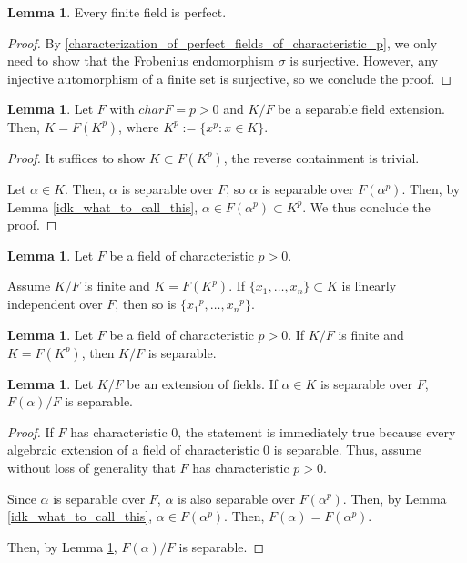 \documentclass{article}
\theoremstyle{definition}
\newtheorem{lemma}[theorem]{Lemma}
\begin{document}
\begin{lemma}
    Every finite field is perfect.
\end{lemma}
\begin{proof}
    By \ref{characterization_of_perfect_fields_of_characteristic_p}, we only need to show that the Frobenius endomorphism $\sigma$
    is surjective. However, any injective automorphism of a finite set is surjective, so we conclude the proof.
\end{proof}

\begin{lemma}
    Let $F$ with $charF = p > 0$ and $K/F$ be a separable field extension.
    Then, $K = F(K^{p})$, where $K^{p} := \{ x^{p}: x \in K\}$.
\end{lemma}
\begin{proof}
    It suffices to show $K \subset F(K^{p})$, the reverse containment is trivial.

    Let $\alpha \in K$. Then, $\alpha$ is separable over $F$, so $\alpha$ is separable over $F(\alpha^{p})$.
    Then, by Lemma \ref{idk_what_to_call_this}, $\alpha \in F(\alpha^{p}) \subset K^{p}$. We thus conclude
    the proof.
\end{proof}

\begin{lemma}
    Let $F$ be a field of characteristic $p > 0$.

    Assume $K/F$ is finite and $K = F(K^{p})$. If $\{x_{1}, \ldots, x_{n}\} \subset K$ is linearly independent
    over $F$, then so is $\{{x_{1}}^{p}, \ldots, {x_{n}}^{p}\}$.
\end{lemma}

\begin{lemma}\label{sufficient_condition_for_separability_over_fields_of_characteristic_p}
    Let $F$ be a field of characteristic $p > 0$. If $K/F$ is finite and $K = F(K^{p})$, then $K/F$ is separable.
\end{lemma}

\begin{lemma}\label{adjoining_separable_elements_produce_separable_extensions}
    Let $K/F$ be an extension of fields. If $\alpha \in K$ is separable over $F$,
    $F(\alpha)/F$ is separable.
\end{lemma}
\begin{proof}
    If $F$ has characteristic $0$, the statement is immediately true
    because every algebraic extension of a field of characteristic $0$ is separable. Thus,
    assume without loss of generality that $F$ has characteristic $p > 0$.

    Since $\alpha$ is separable over $F$, $\alpha$ is also separable over $F(\alpha^{p})$.
    Then, by Lemma \ref{idk_what_to_call_this}, $\alpha \in F(\alpha^{p})$. Then, $F(\alpha) = F(\alpha^{p})$.

    Then, by Lemma \ref{sufficient_condition_for_separability_over_fields_of_characteristic_p}, $F(\alpha)/F$
    is separable.
\end{proof}
\end{document}
